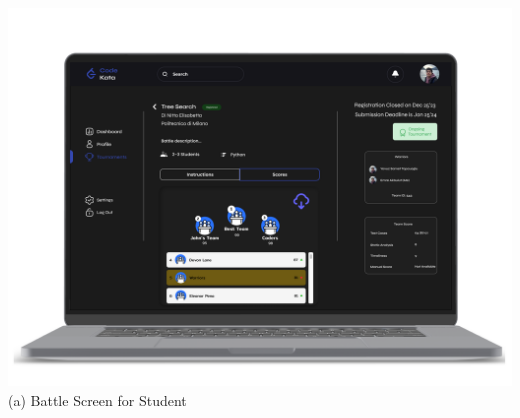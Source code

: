 \begin{center}
\includegraphics[scale=0.13]{Images/ui-ux/student_battle/student_battle_4.png}
      (a) Battle Screen for Student
\end{center}

